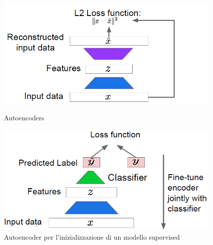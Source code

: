 	\begin{figure}
		\centering
		\begin{minipage}{.5\textwidth}
			\centering
			\includegraphics[width=1\linewidth]{imgs/chapter11/img15}
			\caption{Autoencoders}
			\label{fig:chapter11-15}
		\end{minipage}%
		\begin{minipage}{.5\textwidth}
			\centering
			\includegraphics[width=1\linewidth]{imgs/chapter11/img16}
			\caption{Autoencoder per l'inizializzazione di un modello supervised}
			\label{fig:chapter11-16}
		\end{minipage}
	\end{figure}